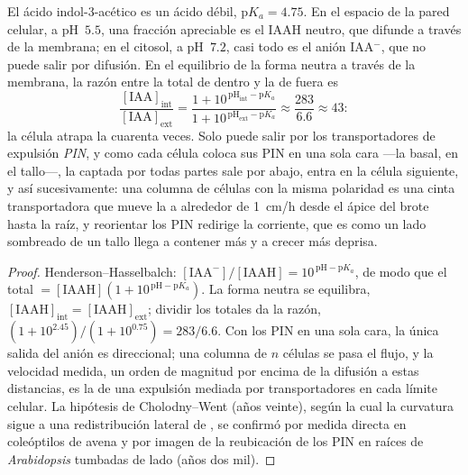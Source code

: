 \begin{theorem}\label{thm:b3:plant-molecular-physiology:auxin}
El ácido indol-3-acético es un ácido débil, $\mathrm{p}K_{a} = 4.75$.
En el espacio de la pared celular, a pH~$5.5$, una fracción
apreciable es el IAAH neutro, que difunde a través de la membrana; en
el citosol, a pH~$7.2$, casi todo es el anión IAA$^{-}$, que no puede
salir por difusión. En el equilibrio de la forma neutra a través de la
membrana, la razón entre la  total de dentro y la de fuera es
\[
\frac{[\text{IAA}]_{\text{int}}}{[\text{IAA}]_{\text{ext}}}
= \frac{1 + 10^{\,\mathrm{pH}_{\text{int}} - \mathrm{p}K_{a}}}{1 + 10^{\,\mathrm{pH}_{\text{ext}} - \mathrm{p}K_{a}}}
\approx \frac{283}{6.6} \approx 43 :
\]
la célula atrapa la  cuarenta veces. Solo puede salir por los
transportadores de expulsión \emph{PIN}, y como cada célula coloca sus
PIN en una sola cara ---la basal, en el tallo---, la  captada por
todas partes sale por abajo, entra en la célula siguiente, y así
sucesivamente: una columna de células con la misma polaridad es una
cinta transportadora que mueve la  a alrededor de \qty{1}{cm/h}
desde el ápice del brote hasta la raíz, y reorientar los PIN redirige
la corriente, que es como un lado sombreado de un tallo llega a
contener más  y a crecer más deprisa.
\end{theorem}
\begin{proof}
Henderson--Hasselbalch: $[\text{IAA}^{-}]/[\text{IAAH}] = 10^{\,\mathrm{pH}
- \mathrm{p}K_{a}}$, de modo que el total $= [\text{IAAH}](1 + 10^{\,\mathrm{pH} -
\mathrm{p}K_{a}})$. La forma neutra se equilibra, $[\text{IAAH}]_{\text{int}}
= [\text{IAAH}]_{\text{ext}}$; dividir los totales da la razón,
$(1 + 10^{2.45})/(1 + 10^{0.75}) = 283/6.6$. Con los PIN en una sola
cara, la única salida del anión es direccional; una columna de $n$
células se pasa el flujo, y la velocidad medida, un orden de magnitud
por encima de la difusión a estas distancias, es la de una expulsión
mediada por transportadores en cada límite celular. La hipótesis de
Cholodny--Went (años veinte), según la cual la curvatura sigue a una
redistribución lateral de , se confirmó por medida directa en
coleóptilos de avena y por imagen de la reubicación de los PIN en
raíces de \emph{Arabidopsis} tumbadas de lado (años dos mil).
\end{proof}

